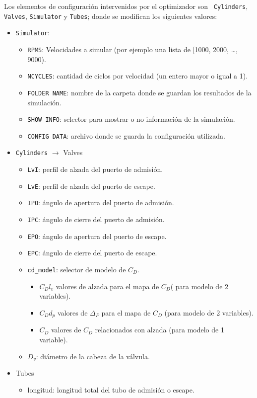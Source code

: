 Los elementos de configuración intervenidos por el optimizador son {\tt
Cylinders}, {\tt Valves}, {\tt Simulator} y {\tt Tubes}; donde se  modifican los
siguientes valores:

\begin{itemize}
  \item {\tt Simulator}:
        \begin{itemize}
          \item {\tt RPMS}: Velocidades a simular (por ejemplo una lista de [1000,
2000, \ldots, 9000).
          \item {\tt NCYCLES}: cantidad de ciclos por velocidad (un entero mayor o igual a 1).
          \item {\tt FOLDER NAME}: nombre de la carpeta donde se guardan los
resultados de la simulación.
          \item {\tt SHOW INFO}: selector para mostrar o no información de la simulación.
          \item {\tt CONFIG DATA}: archivo donde se guarda la configuración utilizada.
        \end{itemize}
  \item {\tt Cylinders} $\longrightarrow$ Valves
        \begin{itemize}
          \item {\tt LvI}: perfil de alzada del puerto de admisión.
          \item {\tt LvE}: perfil de alzada del puerto de escape.
          \item {\tt IPO}: ángulo de apertura del puerto de admisión.
          \item {\tt IPC}: ángulo de cierre del puerto de admisión.
          \item {\tt EPO}: ángulo de apertura del puerto de escape.
          \item {\tt EPC}: ángulo de cierre del puerto de escape.
          \item {\tt cd\_model}: selector de modelo de $C_{D}$.
                \begin{itemize}
                  \item $C_{D}l_{v}$ valores de alzada para el mapa de $C_{D}$(
para modelo de 2 variables).
                  \item $C_{D}d_{p}$ valores de $\Delta_{P}$ para el mapa de
$C_{D}$ (para modelo de 2 variables).
                  \item $C_{D}$ valores de $C_{D}$ relacionados con alzada (para modelo de 1 variable).
                \end{itemize}
          \item $D_{v}$: diámetro de la cabeza de la válvula.
        \end{itemize}
  \item Tubes
        \begin{itemize}
          \item longitud: longitud total del tubo de admisión o escape.
        \end{itemize}
\end{itemize}

